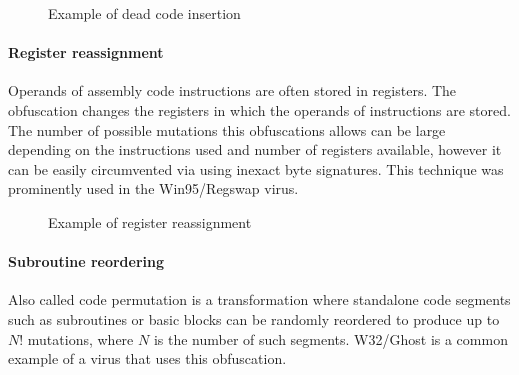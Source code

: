 \begin{figure}[H]
    \centering
    \caption{Example of dead code insertion}
    \label{fig_obf_dci}
\end{figure}

\paragraph*{Register reassignment}
Operands of assembly code instructions are often stored in registers. The obfuscation changes the registers in which the operands of instructions are stored. The number of possible mutations this obfuscations allows can be large depending on the instructions used and number of registers available, however it can be easily circumvented via using inexact byte signatures. This technique was prominently used in the Win95/Regswap virus.

\begin{figure}[H]
    \centering
    \caption{Example of register reassignment}
    \label{fig_obf_regswap}
\end{figure}

\paragraph*{Subroutine reordering}
Also called code permutation is a transformation where standalone code segments such as subroutines or basic blocks can be randomly reordered to produce up to $N!$ mutations, where $N$ is the number of such segments. W32/Ghost is a common example of a virus that uses this obfuscation.

